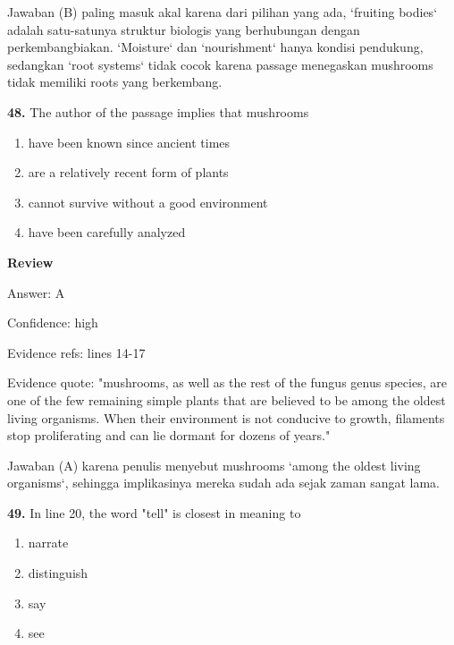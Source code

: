 \documentclass[12pt]{article}
\begin{document}
Jawaban (B) paling masuk akal karena dari pilihan yang ada, `fruiting bodies` adalah satu-satunya struktur biologis yang berhubungan dengan perkembangbiakan. `Moisture` dan `nourishment` hanya kondisi pendukung, sedangkan `root systems` tidak cocok karena passage menegaskan mushrooms tidak memiliki roots yang berkembang.\par
\endgroup
\par
\vspace{0.25\baselineskip}
\noindent\textbf{48.} The author of the passage implies that mushrooms
\begin{enumerate}[label=(\Alph*),leftmargin=*,itemsep=0.2em]
\item have been known since ancient times
\item are a relatively recent form of plants
\item cannot survive without a good environment
\item have been carefully analyzed
\end{enumerate}
\par
\begingroup
\setlength{\parskip}{0pt}
\setlength{\parindent}{0pt}
\textbf{Review}\par
Answer: A\par
Confidence: high\par
Evidence refs: lines 14-17\par
Evidence quote: "mushrooms, as well as the rest of the fungus genus species, are one of the few remaining simple plants that are believed to be among the oldest living organisms. When their environment is not conducive to growth, filaments stop proliferating and can lie dormant for dozens of years."\par
Jawaban (A) karena penulis menyebut mushrooms `among the oldest living organisms`, sehingga implikasinya mereka sudah ada sejak zaman sangat lama.\par
\endgroup
\par
\vspace{0.25\baselineskip}
\noindent\textbf{49.} In line 20, the word "tell" is closest in meaning to
\begin{enumerate}[label=(\Alph*),leftmargin=*,itemsep=0.2em]
\item narrate
\item distinguish
\item say
\item see
\end{enumerate}
\par
\begingroup
\setlength{\parskip}{0pt}
\setlength{\parindent}{0pt}
\end{document}
